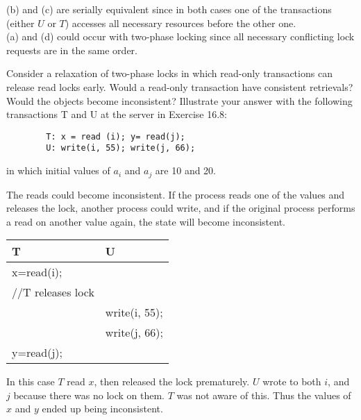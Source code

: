 \documentclass{article}
\begin{document}
\begin{tcolorbox}[colback=green!5!white,colframe=green!75!black,title=Answer 16.9]
(b) and (c) are serially equivalent since in both cases one of the transactions (either $U$ or $T$) accesses all necessary resources before the other one.
\\
(a) and (d) could occur with two-phase locking since all necessary conflicting lock requests are in the same order. 
\end{tcolorbox}

\begin{tcolorbox}[colback=blue!5!white,colframe=blue!75!black,title=Problem 16.10]
Consider a relaxation of two-phase locks in which read-only transactions can release
read locks early. Would a read-only transaction have consistent retrievals? Would the
objects become inconsistent? Illustrate your answer with the following transactions T
and U at the server in Exercise 16.8:
    \begin{verbatim}
        T: x = read (i); y= read(j);
        U: write(i, 55); write(j, 66);
    \end{verbatim}
in which initial values of $a_i$ and $a_j$ are 10 and 20.
\end{tcolorbox}
\begin{tcolorbox}[colback=green!5!white,colframe=green!75!black,title=Answer 16.10]
    The reads could become inconsistent. If the process reads one of the values and releases the lock, 
    another process could write, and if the original process performs a read on another value again, the
    state will become inconsistent.
    \begin{table}[H]
    \centering
    \begin{tabular}{ll}
    T                                        & U                                   \\ \hline
    \multicolumn{1}{l}{x=read(i);}           & \multicolumn{1}{l}{} \\
    \multicolumn{1}{l}{//T releases lock} & \multicolumn{1}{l}{}             \\
    \multicolumn{1}{l}{} & \multicolumn{1}{l}{write(i, 55);}             \\
    \multicolumn{1}{l}{} & \multicolumn{1}{l}{write(j, 66);}             \\
                       y=read(j);            &                     \\
    \end{tabular}
    \end{table}
In this case $T$ read $x$, then released the lock prematurely. $U$ wrote to both $i$, and $j$ because there
was no lock on them. $T$ was not aware of this. Thus the values of $x$ and $y$ ended up being inconsistent.
\end{tcolorbox}
\end{document}
